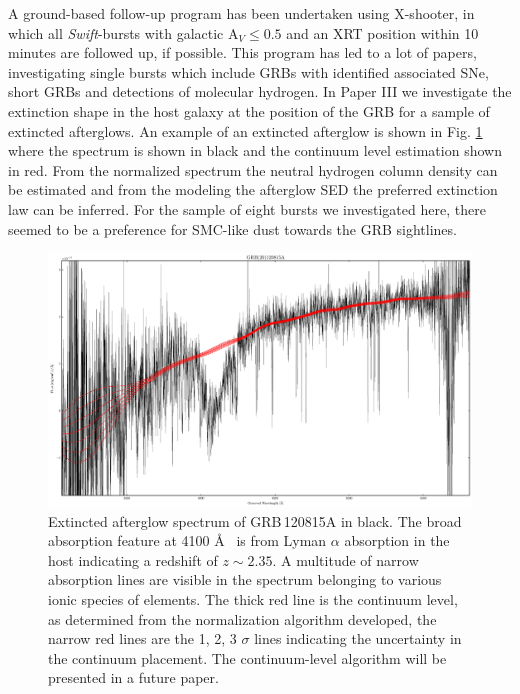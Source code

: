 A ground-based follow-up program has been undertaken using X-shooter, in which
all \textit{Swift}-bursts with galactic A$_{V} \leq 0.5$ and an XRT position
within 10 minutes are followed up, if possible. This program has led to a lot of
papers, investigating single bursts \citep[e.g.][to mention some]{Sparre2011,
DElia2014, Kruhler2013a, Xu2013a, DeUgartePostigo2014, Schulze2014a, Japelj2015,
Hartoog2015} which include GRBs with identified associated SNe, short GRBs and
detections of molecular hydrogen. 
In Paper III \citep{Japelj2015} we investigate the extinction shape in the host
galaxy at the position of the GRB for a sample of extincted afterglows. An
example of an extincted afterglow is shown in Fig. \ref{fig:intro:grbext} where
the spectrum is shown in black and the continuum level estimation shown in red.
From the normalized spectrum the neutral hydrogen column density can be
estimated and from the modeling the afterglow SED the preferred extinction law
can be inferred. For the sample of eight bursts we investigated here, there
seemed to be a preference for SMC-like dust towards the GRB sightlines. 
\begin{figure}[htb]
	\includegraphics[width=\textwidth]{gfx/normspec}
	\caption{Extincted afterglow spectrum of GRB\,120815A in black. The broad
absorption feature at 4100 \AA~ is from Lyman $\alpha$ absorption in the host
indicating a redshift of $z \sim 2.35$. A multitude of narrow absorption lines
are visible in the spectrum belonging to various ionic species of elements. The
thick red line is the continuum level, as determined from the normalization
algorithm developed, the narrow red lines are the 1, 2, 3 $\sigma$ lines
indicating the uncertainty in the continuum placement. The continuum-level
algorithm will be presented in a future paper. }
	\label{fig:intro:grbext}
\end{figure}
